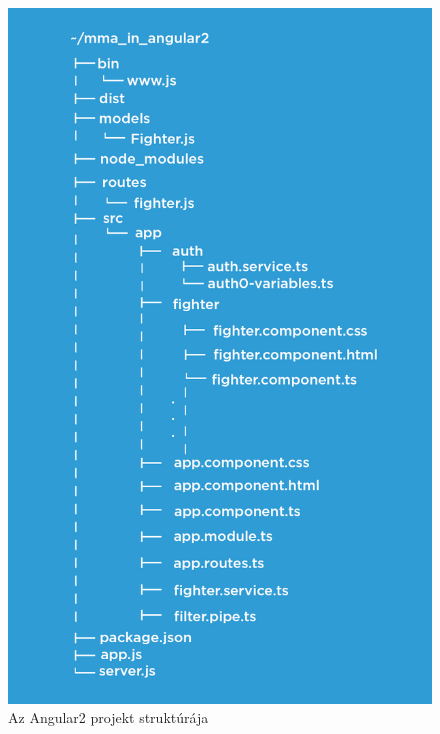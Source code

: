 
\begin{figure}[htb]
\centering
\includegraphics[scale=0.4]{kepek/mma_in_angular2.jpeg}
\caption{Az Angular2 projekt struktúrája}
\label{fig:angularjs_structure}
\end{figure}
